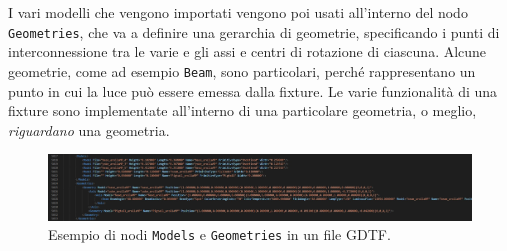 \documentclass[main.tex]{subfiles}
\begin{document}
I vari modelli che vengono importati vengono poi usati all'interno del nodo \lstinline{Geometries}, che va a definire una gerarchia di geometrie, specificando i punti di interconnessione tra le varie e gli assi e centri di rotazione di ciascuna. Alcune geometrie, come ad esempio \lstinline{Beam}, sono particolari, perché rappresentano un punto in cui la luce può essere emessa dalla fixture.\newline
Le varie funzionalità di una fixture sono implementate all'interno di una particolare geometria, o meglio, \textit{riguardano} una geometria.
\begin{figure}[H]
    \centering
    \includegraphics[width=1\linewidth]{img/introduzione/GDTFgeometriesExample.jpg}
    \caption{Esempio di nodi \lstinline{Models} e \lstinline{Geometries} in un file GDTF.}
    \label{fig:1_gdtfGeometriesExample}
\end{figure}
\end{document}
